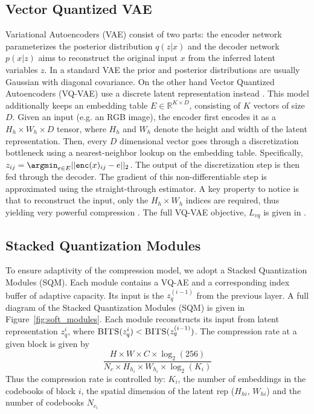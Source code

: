 \documentclass[colorinlistoftodos]{article} %
\begin{document}
\subsection{Vector Quantized VAE}
Variational Autoencoders (VAE) \citep{kingma2013auto} consist of two parts: the encoder network parameterizes the posterior distribution $q(z|x)$ and the decoder network $p(x|z)$ aims to reconstruct the original input $x$ from the inferred latent variables $z$. In a standard VAE the prior and posterior distributions are usually Gaussian with diagonal covariance. On the other hand Vector Quantized Autoencoders (VQ-VAE) use a discrete latent representation instead \citep{van2017neural}. This model additionally keeps an embedding table $E \in \mathbb{R}^{K \times D}$, consisting of $K$ vectors of size $D$. Given an input (e.g. an RGB image), the encoder first encodes it as a $H_h \times W_h \times D$ tensor, where $H_h$ and $W_h$ denote the height and width of the latent representation. Then, every $D$ dimensional vector goes through a discretization bottleneck using a nearest-neighbor lookup on the embedding table. Specifically,  $z_{ij} = \argmin_{e \in E} || \texttt{enc}(x)_{ij} - e ||_2$. 
The output of the discretization step is then fed through the decoder. The gradient of this  non-differentiable step is approximated using the straight-through estimator. A key property to notice is that to reconstruct the input, only the $H_h \times W_h$ indices are required, thus yielding very powerful compression \citep{van2017neural}. The full VQ-VAE objective, $L_{vq}$ is given in \citet{van2017neural}.



\subsection{Stacked Quantization Modules}
To ensure adaptivity of the compression model, we adopt a Stacked Quantization Modules (SQM). Each module contains a VQ-AE and a corresponding index buffer of adaptive capacity. Its input is the $z_q^{(i-1)}$ from the previous layer. A full diagram of the Stacked Quantization Modules (SQM) is given in Figure~\ref{fig:soft_modules}. Each module reconstructs its input from latent representation $z_q^{i}$, where $\textsc{BITS}(z_q^{i}) < \textsc{BITS}(z_q^{(i-1)})$. The compression rate at a given block is given by
$$
    \frac{H \times W \times C \times  \log_2{(256)}}
         {N_c \times H_h_i \times W_h_i \times \log_2{(K_i)}}
$$
Thus the compression rate is controlled by: $K_i$, the number of embeddings in the codebooks of block $i$, the spatial dimension of the latent rep ($H_{hi}$, $W_{hi}$) and the number of codebooks $N_c_i$ 
\end{document}
